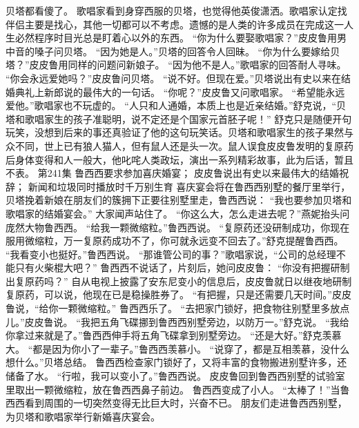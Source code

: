 \documentclass[a4paper,12pt,UTF8,twoside]{ctexbook}
\begin{document}
        贝塔都看傻了。  
        歌唱家看到身穿西服的贝塔，也觉得他英俊潇洒。歌唱家认定找伴侣主要是找心，其他一切都可以不考虑。遗憾的是人类的许多成员在完成这一人生必然程序时目光总是盯着心以外的东西。  
        “你为什么要娶歌唱家？”皮皮鲁用男中音的嗓子问贝塔。  
        “因为她是人。”贝塔的回答令人回昧。  
        “你为什么要嫁给贝塔？”皮皮鲁用同样的问题问新娘子。  
        “因为他不是人。”歌唱家的回答耐人寻味。  
        “你会永远爱她吗？”皮皮鲁问贝塔。  
        “说不好。但现在爱。”贝塔说出有史以来在结婚典礼上新郎说的最伟大的一句话。  
        “你呢？”皮皮鲁又问歌唱家。  
        “希望能永远爱他。”歌唱家也不玩虚的。  
        “人只和人通婚，本质上也是近亲结婚。”舒克说，“贝塔和歌唱家生的孩子准聪明，说不定还是个国家元首胚子呢！”  
        舒克只是随便开句玩笑，没想到后来的事还真验证了他的这句玩笑话。贝塔和歌唱家生的孩子果然与众不同，世上已有狼人猫人，但有鼠人还是头一次。鼠人误食皮皮鲁发明的复原药后身体变得和人一般大，他叱咤人类政坛，演出一系列精彩故事，此为后话，暂且不表。          第241集  
        鲁西西要求参加喜庆婚宴；  
        皮皮鲁说出有史以来最伟大的结婚祝辞；  
        新闻和垃圾同时播放时千万别生育   
        喜庆宴会将在鲁西西别墅的餐厅里举行，贝塔挽着新娘在朋友们的簇拥下正要往别墅里走，鲁西西说：  
        “我也要参加贝塔和歌唱家的结婚宴会。”  
        大家闻声站住了。  
        “你这么大，怎么走进去呢？”燕妮抬头问庞然大物鲁西西。  
        “给我一颗微缩粒。”鲁西西说。  
        “复原药还没研制成功，你现在服用微缩粒，万一复原药成功不了，你可就永远变不回去了。”舒克提醒鲁西西。        
        “我看变小也挺好。”鲁西西说。  
        “那谁管公司的事？”歌唱家说，“公司的总经理不能只有火柴棍大吧？”  
        鲁西西不说话了，片刻后，她问皮皮鲁：  
        “你没有把握研制出复原药吗？”  
        自从电视上披露了安东尼变小的信息后，皮皮鲁就日以继夜地研制复原药，可以说，他现在已是稳操胜券了。  
        “有把握，只是还需要几天时间。”皮皮鲁说，“给你一颗微缩粒。”  
        鲁西西乐了。  
        “去把家门锁好，把食物往别墅里多放点儿。”皮皮鲁说。  
        “我把五角飞碟挪到鲁西西别墅旁边，以防万一。”舒克说。  
        “我给你拿过来就是了。”鲁西西伸手将五角飞碟拿到别墅旁边。  
        “还是大好。”舒克羡慕大。  
        “都是因为你小了一辈子。”鲁西西羡慕小。  
        “说穿了，都是互相羡慕，没什么想什么。”贝塔总结。  
        鲁西西检查家门锁好了，又将丰富的食物搬进别墅许多，还储备了水。  
        “行啦，我可以变小了。”鲁西西说。        
        皮皮鲁回到鲁西西别墅的试验室里取出一颗微缩粒，放在鲁西西鼻子前边。  
        鲁西西变成了小人。  
        “太棒了！”当鲁西西看到周围的一切突然变得无比巨大时，兴奋不已。  
        朋友们走进鲁西西别墅，为贝塔和歌唱家举行新婚喜庆宴会。  
\end{document}
